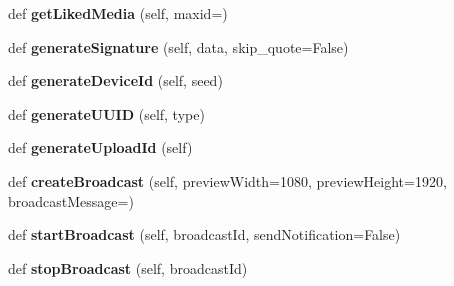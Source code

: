 \begin{DoxyCompactItemize}
def {\bfseries get\+Liked\+Media} (self, maxid=\textquotesingle{}\textquotesingle{})
\item 
\mbox{\label{class_instagram_a_p_i_1_1_instagram_a_p_i_1_1_instagram_a_p_i_a65b5863720431d27b6a9cb275a57ef42}} 
def {\bfseries generate\+Signature} (self, data, skip\+\_\+quote=False)
\item 
\mbox{\label{class_instagram_a_p_i_1_1_instagram_a_p_i_1_1_instagram_a_p_i_a630634785719395f4b9960b463f7ad2b}} 
def {\bfseries generate\+Device\+Id} (self, seed)
\item 
\mbox{\label{class_instagram_a_p_i_1_1_instagram_a_p_i_1_1_instagram_a_p_i_a3652fe0d2e217bd3d0e2e61ddd05e3b5}} 
def {\bfseries generate\+U\+U\+ID} (self, type)
\item 
\mbox{\label{class_instagram_a_p_i_1_1_instagram_a_p_i_1_1_instagram_a_p_i_ae002e803a354c1e72f6d1ea4cbf4ab06}} 
def {\bfseries generate\+Upload\+Id} (self)
\item 
\mbox{\label{class_instagram_a_p_i_1_1_instagram_a_p_i_1_1_instagram_a_p_i_af1db471f9908c04e7a85dc2046b6bc11}} 
def {\bfseries create\+Broadcast} (self, preview\+Width=1080, preview\+Height=1920, broadcast\+Message=\textquotesingle{}\textquotesingle{})
\item 
\mbox{\label{class_instagram_a_p_i_1_1_instagram_a_p_i_1_1_instagram_a_p_i_a9b9e43685b101aeb0c75bd4f4fc560a9}} 
def {\bfseries start\+Broadcast} (self, broadcast\+Id, send\+Notification=False)
\item 
\mbox{\label{class_instagram_a_p_i_1_1_instagram_a_p_i_1_1_instagram_a_p_i_a73da9c21461fc74e031114b1399b1d70}} 
def {\bfseries stop\+Broadcast} (self, broadcast\+Id)
\item 
\mbox{\label{class_instagram_a_p_i_1_1_instagram_a_p_i_1_1_instagram_a_p_i_a31600945db9ced4ea0f7144ca7097a4c}} 

\end{DoxyCompactItemize}
